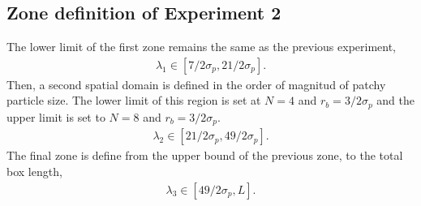 \documentclass[a4paper]{tufte-handout} %
\begin{document}
\subsection{Zone definition of Experiment 2}

The lower limit of the first zone remains the same as the previous experiment,
\begin{gather*}
    \lambda_1\in\left[ 7/2\sigma_p,21/2\sigma_p \right].
\end{gather*}
Then, a second spatial domain is defined in the order of magnitud of patchy particle size.
The lower limit of this region is set at $N=4$ and $r_b=3/2\sigma_p$ and the upper limit is set to $N=8$ and $r_b=3/2\sigma_p$.
\begin{gather*}
    \lambda_2\in\left[ 21/2\sigma_p,49/2\sigma_p \right].
\end{gather*}
The final zone is define from the upper bound of the previous zone, to the total box length,
\begin{gather*}
    \lambda_3\in\left[ 49/2\sigma_p,L \right].
\end{gather*}
\end{document}
